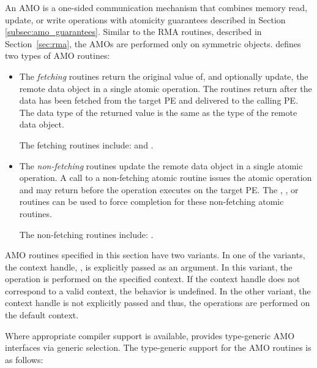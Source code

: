 An \ac{AMO} is a one-sided communication mechanism that combines memory read,
update, or write operations with atomicity guarantees described in Section~%
\ref{subsec:amo_guarantees}.  Similar to the \ac{RMA} routines, described in
Section~\ref{sec:rma}, the \acp{AMO} are performed only on symmetric objects.
\openshmem defines two types of \ac{AMO} routines:

\begin{itemize}

\item
  The \emph{fetching} routines return the original value of, and optionally
  update, the remote data object in a single atomic operation.  The routines
  return after the data has been fetched from the target \ac{PE} and delivered
  to the calling \ac{PE}.
  The data type of the returned value is the same as the type of
  the remote data object.

  The fetching routines include:
   and
  .

\item
  The \emph{non-fetching} routines update the remote data object in a single
  atomic operation.  A call to a non-fetching atomic routine issues the atomic
  operation and may return before the operation executes on the target \ac{PE}.
  The , , or 
  routines can be used to force completion for these non-fetching
  atomic routines.

  The non-fetching routines include:
  .

\end{itemize}

\openshmem \ac{AMO} routines specified in this section have two variants. In
one of the variants, the context handle, , is explicitly passed as
an argument. In this variant, the operation is performed on the specified
context. If the context handle  does not correspond to a valid
context, the behavior is undefined. In the other variant, the context handle
is not explicitly passed and thus, the operations are performed on the
default context.

Where appropriate compiler support is available, \openshmem provides
type-generic \ac{AMO} interfaces via \Cstd[11] generic selection.
The type-generic support for the \ac{AMO} routines is as follows:

